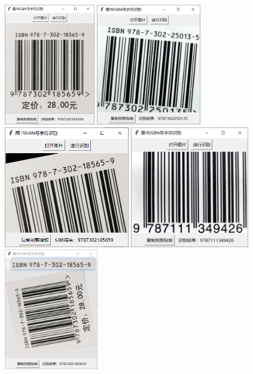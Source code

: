 \documentclass{ctexart}
\begin{document}
\begin{figure}[H]
    \centering
    \includegraphics[height=150pt]{test_07}\quad
    \includegraphics[height=150pt]{test_08}\\
    \includegraphics[height=150pt]{test_09}\quad
    \includegraphics[height=150pt]{test_10}\\
    \includegraphics[height=150pt]{test_11}\quad

\end{figure}
\end{document}
